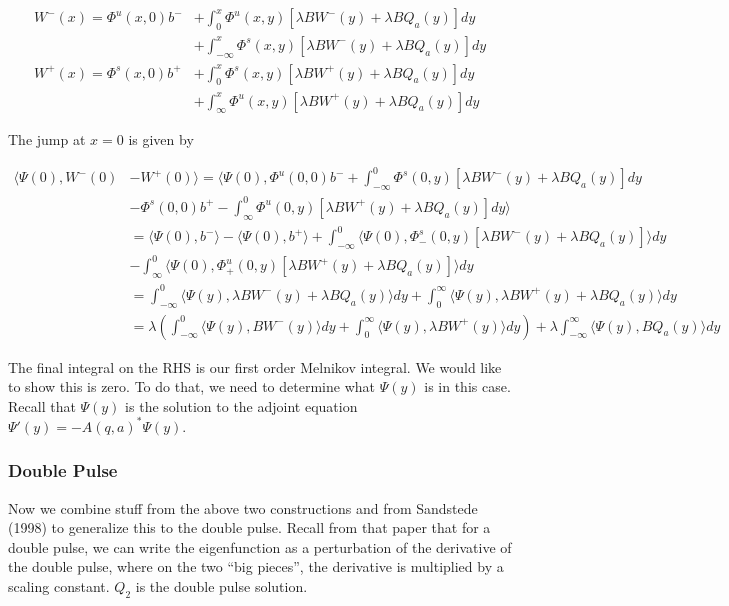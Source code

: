 \documentclass[12pt]{article}
\begin{document}
\begin{align*}
W^-(x) = \Phi^u(x, 0)b^- &+ \int_0^x \Phi^u(x, y)[\lambda B W^-(y) + \lambda B Q_a(y) ] dy \\
&+ \int_{-\infty}^x \Phi^s(x, y)[\lambda B W^-(y) + \lambda B Q_a(y) ] dy \\
W^+(x) = \Phi^s(x, 0)b^+ &+ \int_0^x \Phi^s(x, y)[\lambda B W^+(y) + \lambda B Q_a(y) ] dy \\
&+ \int_{\infty}^x \Phi^u(x, y)[\lambda B W^+(y) + \lambda B Q_a(y) ] dy
\end{align*}

The jump at $x = 0$ is given by

\begin{align*}
\langle\Psi(0), W^-(0) &- W^+(0)\rangle = \langle \Psi(0), \Phi^u(0, 0)b^- + \int_{-\infty}^0 \Phi^s(0, y)[\lambda B W^-(y) + \lambda B Q_a(y) ] dy  \\
&- \Phi^s(0, 0)b^+ - \int_\infty^0 \Phi^u(0, y)[\lambda B W^+(y) + \lambda B Q_a(y) ] dy \rangle\\
&= \langle \Psi(0), b^- \rangle - \langle \Psi(0), b^+ \rangle + \int_{-\infty}^0 \langle \Psi(0), \Phi^s_-(0, y)[\lambda B W^-(y) + \lambda B Q_a(y) ] \rangle dy  \\
&- \int_\infty^0 \langle \Psi(0), \Phi^u_+(0, y)[\lambda B W^+(y) + \lambda B Q_a(y) ] \rangle dy  \\
&= \int_{-\infty}^0 \langle \Psi(y), \lambda B W^-(y) + \lambda B Q_a(y) \rangle dy 
+ \int_0^\infty \langle \Psi(y), \lambda B W^+(y) + \lambda B Q_a(y)  \rangle dy \\
&= \lambda\left( \int_{-\infty}^0 \langle \Psi(y), B W^-(y) \rangle dy + \int_0^\infty \langle \Psi(y), \lambda B W^+(y) \rangle dy \right) + \lambda \int_{-\infty}^\infty \langle\Psi(y), BQ_a(y) \rangle dy
\end{align*}

The final integral on the RHS is our first order Melnikov integral. We would like to show this is zero. To do that, we need to determine what $\Psi(y)$ is in this case. Recall that $\Psi(y)$ is the solution to the adjoint equation $\Psi'(y) = -A(q, a)^*\Psi(y)$. 

\subsubsection*{Double Pulse}

Now we combine stuff from the above two constructions and from Sandstede (1998) to generalize this to the double pulse. Recall from that paper that for a double pulse, we can write the eigenfunction as a perturbation of the derivative of the double pulse, where on the two ``big pieces'', the derivative is multiplied by a scaling constant. $Q_2$ is the double pulse solution.
\end{document}
